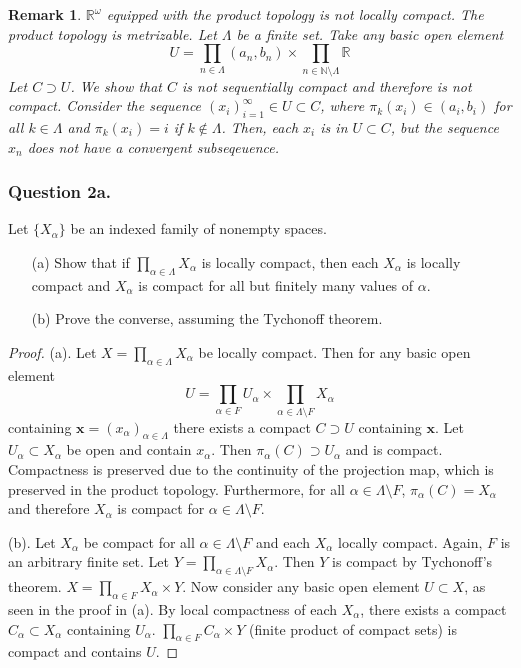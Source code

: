 \documentclass[12pt]{article}
\newtheorem{remark}{Remark}
\begin{document}
\begin{remark}
    $\mathbb{R}^\omega$ equipped with the product topology is not locally compact.
    The product topology is metrizable. Let $\Lambda$ be a finite set.
    Take any basic open element
    $$U  = \prod_{n \in \Lambda} (a_n, b_n) 
    \times \prod_{n \in \mathbb{N}\setminus  \Lambda} \mathbb{R}$$
    Let $C \supset U$. We show that $C$
    is not sequentially compact and therefore is not compact.
    Consider the sequence $(x_i)_{i=1}^\infty \in U \subset C$,
    where $\pi_k(x_i) \in (a_i, b_i) $ for all $k \in \Lambda$ and $\pi_k(x_i) = i$
    if $k \notin \Lambda$. Then, each $x_i$ is in $U \subset C$,
    but the sequence $x_n$ does not have a convergent subseqeuence.

\end{remark}

\subsubsection*{Question 2a.}
Let $\{X_\alpha\}$ be an indexed family of nonempty spaces.
\begin{itemize}
    \item[(a)] Show that if $\prod_{\alpha \in \Lambda} X_\alpha$ is locally compact, then each $X_\alpha$ is locally compact and $X_\alpha$ is compact for all but finitely many values of $\alpha$.
    \item[(b)] Prove the converse, assuming the Tychonoff theorem.
\end{itemize}

\begin{proof} (a).
        Let $X = \prod_{\alpha \in \Lambda} X_\alpha$ be locally compact.
        Then for any basic open element 
        $$U  = \prod_{\alpha \in F} U_\alpha
    \times \prod_{\alpha \in \Lambda\setminus F} X_\alpha$$
    containing $\mathbf{x} = (x_\alpha)_{\alpha \in \Lambda}$
    there exists a compact $C \supset U$ containing $\mathbf{x}$.
    Let $U_\alpha \subset X_\alpha$ be open and contain $x_\alpha$.
    Then $\pi_\alpha(C) \supset U_\alpha$ and is compact. Compactness is preserved
    due to the continuity of the projection map, which is preserved in the product topology.
    Furthermore, for all $\alpha \in \Lambda \setminus F$, 
    $\pi_\alpha(C) = X_\alpha$ and therefore $X_\alpha$ is compact for $\alpha \in \Lambda \setminus F$.
   
    (b). Let $X_\alpha$ be compact for all $\alpha \in \Lambda \setminus F$ and each
    $X_\alpha$ locally compact. Again, $F$ is an arbitrary finite set. 
    Let $Y = \prod_{\alpha \in \Lambda \setminus F} X_\alpha$.
    Then $Y$ is compact by Tychonoff's theorem. $X = \prod_{\alpha \in F} X_\alpha \times Y$. Now consider any basic 
    open element $U \subset X$, as seen in the proof in (a). 
    By local compactness of each $X_\alpha$, there exists a compact $C_\alpha \subset X_\alpha$
    containing $U_\alpha$. $\prod_{\alpha \in F} C_\alpha \times Y$
    (finite product of compact sets) is compact and contains $U$.
\end{proof}
\end{document}
